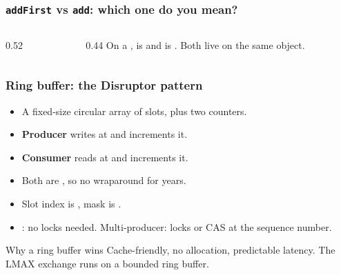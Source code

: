 \documentclass[aspectratio=169,10pt,compress]{beamer}
\begin{document}
\begin{frame}[t,fragile] \frametitle{\texttt{addFirst} vs \texttt{add}: which one do you mean?}
  \begin{columns}[T]
    \begin{column}{0.52\textwidth}
    \end{column}
    \begin{column}{0.44\textwidth}
      \small
      On a ,  is  and
       is . Both live on the same object.
    \end{column}
  \end{columns}
\end{frame}





\begin{frame}[t,fragile] \frametitle{Ring buffer: the Disruptor pattern}
  \begin{itemize}
    \item A fixed-size circular array of slots, plus two counters.
    \item \textbf{Producer} writes at  and increments it.
    \item \textbf{Consumer} reads at  and increments it.
    \item Both are , so no wraparound for years.
    \item Slot index is , mask is .
    \item {}: no locks needed.
          Multi-producer: locks or CAS at the sequence number.
  \end{itemize}
  \begin{block}{Why a ring buffer wins}
    \small
    Cache-friendly, no allocation, predictable latency.
    The LMAX exchange runs on a bounded ring buffer.
  \end{block}
\end{frame}
\end{document}
